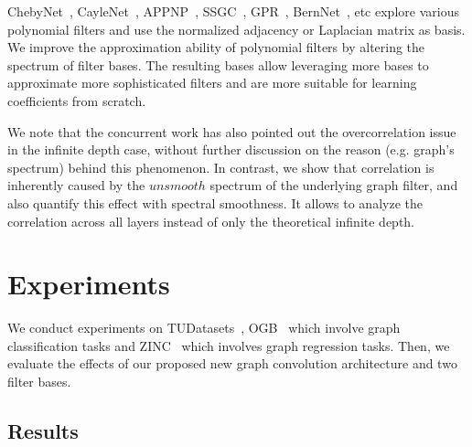 \documentclass[nohyperref]{article}
\theoremstyle{plain}
\theoremstyle{definition}
\theoremstyle{remark}
\begin{document}
ChebyNet~\cite{defferrard2016convolutional}, CayleNet~\cite{8521593}, APPNP~\cite{klicpera_predict_2019}, SSGC~\cite{zhu2020simple}, GPR~\cite{chien2021adaptive}, BernNet~\cite{he2021bernnet}, etc explore various polynomial filters and use the normalized adjacency or Laplacian matrix as basis.
We improve the approximation ability of polynomial filters by altering the spectrum of filter bases.
The resulting bases allow leveraging more bases to approximate more sophisticated filters and are more suitable for learning coefficients from scratch.

We note that the concurrent work \cite{jin2022towards} has also pointed out the overcorrelation issue in the infinite depth case, without further discussion on the reason (e.g. graph's spectrum) behind this phenomenon.
In contrast, we show that correlation is inherently caused by the $unsmooth$ spectrum of the underlying graph filter, and also quantify this effect with spectral smoothness.
It allows to analyze the correlation across all layers instead of only the theoretical infinite depth.


\section{Experiments}

We conduct experiments on TUDatasets~\cite{yanardag2015deep,KKMMN2016}, OGB~\cite{hu2020open} which involve graph classification tasks and ZINC~\cite{dwivedi2020benchmarking} which involves graph regression tasks.
Then, we evaluate the effects of our proposed new graph convolution architecture and two filter bases.

\subsection{Results}
\end{document}
